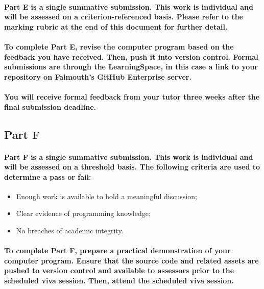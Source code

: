 \documentclass{../../fal_assignment}
\begin{document}
\paragraph{Part E is a \textbf{single summative submission}. This work is \textbf{individual} and will be assessed on a \textbf{criterion-referenced} basis. Please refer to the marking rubric at the end of this document for further detail.}

\paragraph{To complete Part E, revise the computer program based on the feedback you have received. Then, push it into version control. Formal submissions are through the LearningSpace, in this case a link to your repository on Falmouth's GitHub Enterprise server.}

\paragraph{You will receive \textbf{formal feedback} from your \textbf{tutor} three weeks after the final submission deadline.}

\subsection*{Part F}

\paragraph{Part F is a \textbf{single summative submission}. This work is \textbf{individual} and will be assessed on a \textbf{threshold} basis.  The following criteria are used to determine a pass or fail:}

\begin{itemize}
	\item Enough work is available to hold a meaningful discussion;
	\item Clear evidence of programming knowledge;
	\item No breaches of academic integrity.
\end{itemize}

\paragraph{To complete Part F, prepare a practical demonstration of your computer program. Ensure that the source code and related assets are pushed to version control and available to assessors prior to the scheduled viva session. Then, attend the scheduled viva session.}
\end{document}
